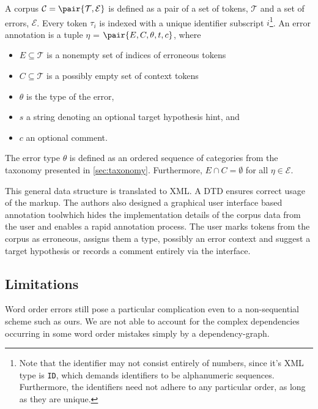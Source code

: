 \documentclass[12pt]{article}
\begin{document}
\begin{definition}\label{def:errorformat}

A corpus $\mathcal{C}=\pair{\mathcal{T},\mathcal{E}}$ is defined as a pair of
a set of tokens, $\mathcal{T}$ and a 
set of errors, $\mathcal{E}$. Every token $\tau_i$ is indexed with a unique
identifier subscript $i$\footnote{Note that the identifier may not consist entirely of
numbers, since it's XML type is \texttt{ID}, which demands identifiers to be
alphanumeric sequences. Furthermore, the identifiers need not adhere to any
particular order, as long as they are unique.}.
An error annotation is a tuple $\eta$ = $\pair{E,C,\theta,t,c}$, where
\begin{itemize}
  \item $E \subseteq \mathcal{T}$ is a nonempty set of indices of erroneous tokens
  \item $C \subseteq \mathcal{T}$ is a possibly empty set of context tokens
  \item $\theta$ is the type of the error,
  \item $s$ a string denoting an optional target hypothesis hint, and
  \item $c$ an optional comment.
\end{itemize}

The error type $\theta$ is defined as an ordered sequence of categories from the
taxonomy presented in \ref{sec:taxonomy}. Furthermore, $E \cap C = \emptyset$
for all $\eta\in\mathcal{E}$.

\end{definition}

This general data structure is translated to XML. A DTD ensures correct usage of
the markup. The authors also designed a graphical user interface based
annotation tool\footnotemark which hides the implementation details of the
corpus data from the user and enables a rapid annotation process. The user marks
tokens from the corpus as erroneous, assigns them a type, possibly an error
context and suggest a target hypothesis or records a comment entirely via the
interface.


\subsection{Limitations}
Word order errors still pose a particular complication even to a non-sequential
scheme such as ours. We are not able to account for the complex dependencies
occurring in some word order mistakes simply by a dependency-graph.
\end{document}
